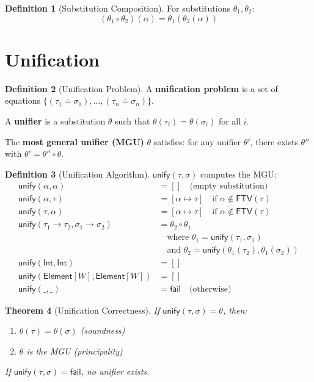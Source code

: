 \documentclass[11pt,twoside,openright]{book}
\theoremstyle{definition}
\newtheorem{definition}{Definition}[chapter]
\theoremstyle{plain}
\newtheorem{theorem}[definition]{Theorem}
\theoremstyle{remark}
\newcommand{\Subst}{\theta}                  %
\newcommand{\Unify}{\mathsf{unify}}          %
\newcommand{\FTV}{\mathsf{FTV}}              %
\begin{document}
\begin{definition}[Substitution Composition]
\label{def:subst-composition}
For substitutions $\Subst_1, \Subst_2$:
\[
(\Subst_1 \circ \Subst_2)(\alpha) = \Subst_1(\Subst_2(\alpha))
\]
\end{definition}

\section{Unification}

\begin{definition}[Unification Problem]
\label{def:unification-problem}
A \textbf{unification problem} is a set of equations $\{(\tau_1 \doteq \sigma_1), \ldots, (\tau_n \doteq \sigma_n)\}$.

A \textbf{unifier} is a substitution $\Subst$ such that $\Subst(\tau_i) = \Subst(\sigma_i)$ for all $i$.

The \textbf{most general unifier (MGU)} $\Subst$ satisfies: for any unifier $\Subst'$, there exists $\Subst''$ with $\Subst' = \Subst'' \circ \Subst$.
\end{definition}

\begin{definition}[Unification Algorithm]
\label{def:unify-algorithm}
$\Unify(\tau, \sigma)$ computes the MGU:
\begin{align}
\Unify(\alpha, \alpha) &= [] \quad \text{(empty substitution)} \\
\Unify(\alpha, \tau) &= [\alpha \mapsto \tau] \quad \text{if } \alpha \notin \FTV(\tau) \\
\Unify(\tau, \alpha) &= [\alpha \mapsto \tau] \quad \text{if } \alpha \notin \FTV(\tau) \\
\Unify(\tau_1 \to \tau_2, \sigma_1 \to \sigma_2) &= \Subst_2 \circ \Subst_1 \\
  &\quad \text{where } \Subst_1 = \Unify(\tau_1, \sigma_1) \\
  &\quad \text{and } \Subst_2 = \Unify(\Subst_1(\tau_2), \Subst_1(\sigma_2)) \\
\Unify(\mathsf{Int}, \mathsf{Int}) &= [] \\
\Unify(\mathsf{Element}[W], \mathsf{Element}[W]) &= [] \\
\Unify(\_, \_) &= \mathsf{fail} \quad \text{(otherwise)}
\end{align}
\end{definition}

\begin{theorem}[Unification Correctness]
\label{thm:unify-correct}
If $\Unify(\tau, \sigma) = \Subst$, then:
\begin{enumerate}
  \item $\Subst(\tau) = \Subst(\sigma)$ (soundness)
  \item $\Subst$ is the MGU (principality)
\end{enumerate}
If $\Unify(\tau, \sigma) = \mathsf{fail}$, no unifier exists.
\end{theorem}
\end{document}
